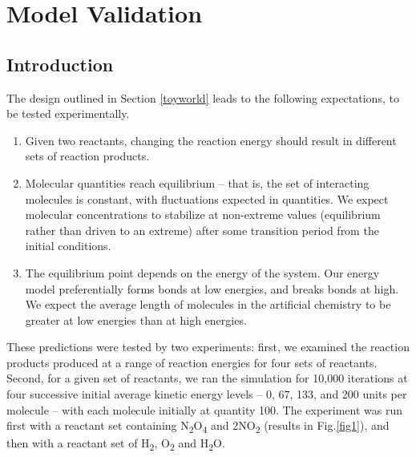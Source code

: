 \chapter{Model Validation}\label{model-validation}

\section{Introduction}\label{introduction-4}

The design outlined in Section
\cref{toyworld} leads to the following expectations, to be tested
experimentally.

\begin{enumerate}
	\item
 Given two reactants, changing the reaction energy should result in
 different sets of reaction products.
	\item
 Molecular quantities reach equilibrium -- that is, the set of
 interacting molecules is constant, with fluctuations expected in
 quantities. We expect molecular concentrations to stabilize at
 non-extreme values (equilibrium rather than driven to an extreme)
 after some transition period from the initial conditions.
	\item
 The equilibrium point depends on the energy of the system. Our energy
 model preferentially forms bonds at low energies, and breaks bonds at
 high. We expect the average length of molecules in the artificial
 chemistry to be greater at low energies than at high energies.
\end{enumerate}

These predictions were tested by two experiments: first, we examined the
reaction products produced at a range of reaction energies for four sets
of reactants. Second, for a given set of reactants, we ran the
simulation for 10,000 iterations at four successive initial average
kinetic energy levels -- 0, 67, 133, and 200 units per molecule -- with
each molecule initially at quantity 100. The experiment was run first
with a reactant set containing N\textsubscript{2}O\textsubscript{4} and
2NO\textsubscript{2} (results in Fig.\cref{fig1}), and then with a
reactant set of H\textsubscript{2}, O\textsubscript{2} and H\textsubscript{2}O.

